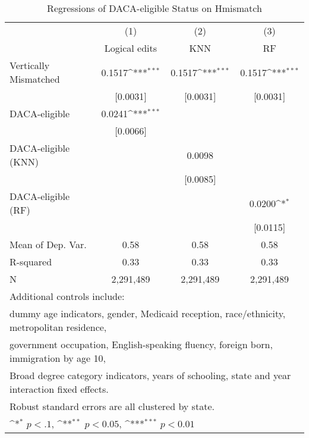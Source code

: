 \begin{table}[htbp]\centering
\def\sym#1{\ifmmode^{#1}\else\(^{#1}\)\fi}
\caption{Regressions of DACA-eligible Status on Hmismatch}
\begin{tabular}{l*{3}{c}}
\toprule
                    &\multicolumn{1}{c}{(1)}         &\multicolumn{1}{c}{(2)}         &\multicolumn{1}{c}{(3)}         \\
                    &Logical edits         &         KNN         &          RF         \\
\midrule
Vertically Mismatched&      0.1517\sym{***}&      0.1517\sym{***}&      0.1517\sym{***}\\
                    &    [0.0031]         &    [0.0031]         &    [0.0031]         \\
\addlinespace
DACA-eligible       &      0.0241\sym{***}&                     &                     \\
                    &    [0.0066]         &                     &                     \\
\addlinespace
DACA-eligible (KNN) &                     &      0.0098         &                     \\
                    &                     &    [0.0085]         &                     \\
\addlinespace
DACA-eligible (RF)  &                     &                     &      0.0200\sym{*}  \\
                    &                     &                     &    [0.0115]         \\
\midrule
Mean of Dep. Var.   &        0.58         &        0.58         &        0.58         \\
R-squared           &        0.33         &        0.33         &        0.33         \\
N                   &   2,291,489         &   2,291,489         &   2,291,489         \\
\bottomrule
\multicolumn{4}{l}{\footnotesize Additional controls include:}\\
\multicolumn{4}{l}{\footnotesize dummy age indicators, gender, Medicaid reception, race/ethnicity, metropolitan residence,}\\
\multicolumn{4}{l}{\footnotesize government occupation, English-speaking fluency, foreign born, immigration by age 10,}\\
\multicolumn{4}{l}{\footnotesize Broad degree category indicators, years of schooling, state and year interaction fixed effects.}\\
\multicolumn{4}{l}{\footnotesize Robust standard errors are all clustered by state.}\\
\multicolumn{4}{l}{\footnotesize \sym{*} \(p<.1\), \sym{**} \(p<0.05\), \sym{***} \(p<0.01\)}\\
\end{tabular}
\end{table}
